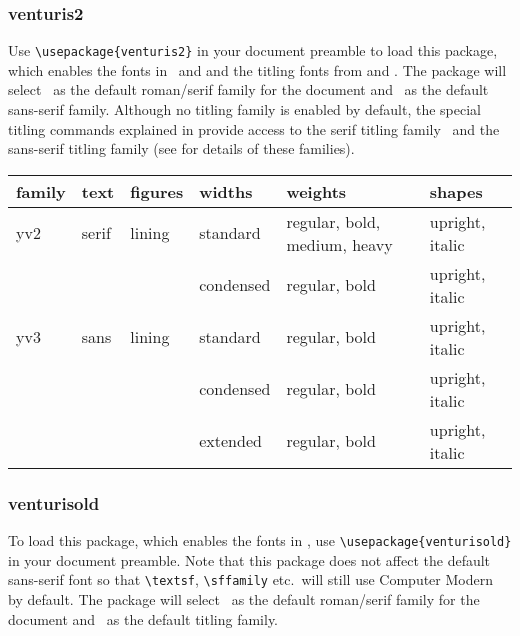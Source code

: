 \documentclass[11pt,british]{article}
\begin{document}
\subsubsection{venturis2}

	Use \verb|\usepackage{venturis2}| in your document preamble to load this package, which enables the fonts in \ and  and the titling fonts from  and . The package will select \ as the default roman/serif family for the document and \ as the default sans-serif family. Although no titling family is enabled by default, the special titling commands explained in  provide access to the serif titling family \ and the sans-serif titling family (see  for details of these families). 
	
	\begin{longtable}{l>{\raggedright}p{}l>{\raggedright}p{}>{\raggedright}p{}>{\raggedright}p{}}
		\toprule
		\textbf{family}	&	\textbf{text}	& \textbf{figures}	&	\textbf{widths}	&	\textbf{weights}	&	 \textbf{shapes}\tabularnewline\midrule\endhead
		\bottomrule\endfoot
		yv2	&	serif	&	lining	&	standard	&	regular, bold, medium, heavy	&	upright, italic\tabularnewline\cmidrule{4-6}
				&				&				&	condensed	&	regular, bold									&	upright, italic\tabularnewline\midrule
		yv3	&	sans		&	lining	&	standard	&	regular, bold 								&	upright, italic\tabularnewline\cmidrule{4-6}
				&				&				&	condensed	&	regular, bold 								&	upright, italic\tabularnewline\cmidrule{4-6}
				&				&				&	extended	&	regular, bold 								&	upright, italic\tabularnewline
	\end{longtable}
	
\subsubsection{venturisold}

	To load this package, which enables the fonts in , use \verb|\usepackage{venturisold}| in your document preamble. Note that this package does not affect the default sans-serif font so that \verb|\textsf|, \verb|\sffamily| etc.\ will still use Computer Modern by default. The package will select \ as the default roman/serif family for the document and \ as the default titling family.
\end{document}
